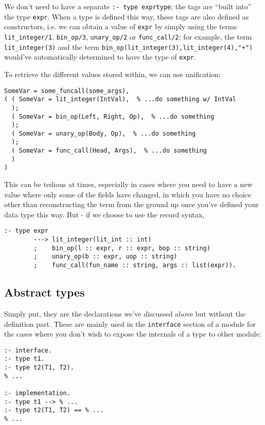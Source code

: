   We don't need to have a separate \texttt{:- type exprtype}; the tags are ``built into'' the type \texttt{expr}. When a type is defined this way, these tags are also defined as constructors, i.e. we can obtain a value of \texttt{expr} by simply using the terms \texttt{lit\_integer/1}, \texttt{bin\_op/3}, \texttt{unary\_op/2} or \texttt{func\_call/2}; for example, the term \texttt{lit\_integer(3)} and the term \texttt{bin\_op(lit\_integer(3),lit\_integer(4),"+")} would've automatically determined to have the type of \texttt{expr}.

  To retrieve the different values stored within, we can use unification:

\begin{lstlisting}[language=Mercury]
% ...
SomeVar = some_funcall(some_args),
( ( SomeVar = lit_integer(IntVal),  % ...do something w/ IntVal
  );
  ( SomeVar = bin_op(Left, Right, Op),  % ...do something
  );
  ( SomeVar = unary_op(Body, Op),  % ...do something
  );
  ( SomeVar = func_call(Head, Args),  % ...do something
  )
)
\end{lstlisting}

  This can be tedious at times, especially in cases where you need to have a new value where only some of the fields have changed, in which you have no choice other than reconstructing the term from the ground up once you've defined your data type this way. But - if we choose to use the record syntax, 

\begin{lstlisting}[language=Mercury]
:- type expr
        ---> lit_integer(lit_int :: int)
        ;    bin_op(l :: expr, r :: expr, bop :: string)
        ;    unary_op(b :: expr, uop :: string)
        ;    func_call(fun_name :: string, args :: list(expr)).
\end{lstlisting}



\subsection{Abstract types}

Simply put, they are the declarations we've discussed above but without the definition part. These are mainly used in the \texttt{interface} section of a module for the cases where you don't wish to expose the internals of a type to other module:

\begin{lstlisting}[language=Mercury]
:- interface.
:- type t1.
:- type t2(T1, T2).
% ...

:- implementation.
:- type t1 --> % ...
:- type t2(T1, T2) == % ...
% ...
\end{lstlisting}

